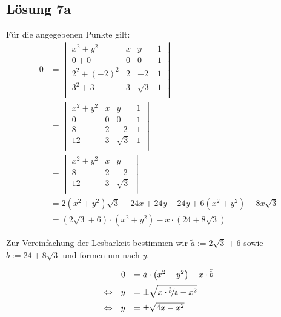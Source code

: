 \documentclass[main.tex]{subfiles}
\begin{document}
\subsection{Lösung 7a}
Für die angegebenen Punkte gilt:
\begin{align*}
    0 &=
    \begin{vmatrix}
           x^2 + y^2 & x &        y & 1 \\
               0 + 0 & 0 &        0 & 1 \\
        2^2 + (-2)^2 & 2 &       -2 & 1 \\
             3^2 + 3 & 3 & \sqrt{3} & 1 \\
    \end{vmatrix}\\
    &=
    \begin{vmatrix}
        x^2 + y^2 & x &        y & 1 \\
                0 & 0 &        0 & 1 \\
                8 & 2 &       -2 & 1 \\
               12 & 3 & \sqrt{3} & 1 \\
    \end{vmatrix}\\
    &=
    \begin{vmatrix}
        x^2 + y^2 & x &        y \\
                8 & 2 &       -2 \\
               12 & 3 & \sqrt{3} \\
    \end{vmatrix}\\
    &= 2\left(x^2 + y^2\right)\sqrt{3} -24x +24y - 24y + 6\left(x^2 + y^2\right) - 8x\sqrt{3} \\[2mm]
    &= \left(2\sqrt{3} +6\right)\cdot \left(x^2 + y^2\right) - x\cdot\left(24 + 8\sqrt{3}\right)
\end{align*}

Zur Vereinfachung der Lesbarkeit bestimmen wir $\tilde{a} := 2\sqrt{3} +6$ sowie $\tilde{b} := 24 + 8\sqrt{3}$ und formen um nach $y$.

\begin{align*}
    \begin{array}[pos]{rrl}
                        & 0 &= \tilde{a}\cdot \left(x^2 + y^2\right) - x\cdot\tilde{b}\\[2mm]
        \Leftrightarrow & y &= \pm \sqrt{x\cdot\nicefrac{\tilde{b}}{\tilde{a}} - x^2} \\[2mm]
        \Leftrightarrow & y &= \pm \sqrt{4x - x^2} \\
    \end{array}
\end{align*}
\end{document}
